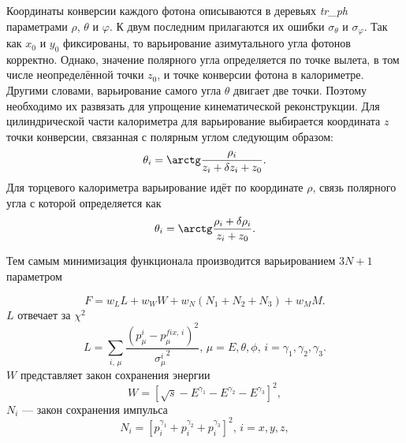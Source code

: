 Координаты конверсии каждого фотона описываются в деревьях \textit{tr\_ph} параметрами $\rho$, $\theta$ и $\varphi$.
К двум последним прилагаются их ошибки $\sigma_\theta$ и $\sigma_\varphi$.
Так как $x_0$ и $y_0$ фиксированы,
то варьирование азимутального угла фотонов корректно.
Однако,
значение полярного угла определяется по точке вылета,
в том числе неопределённой точки $z_0$,
и точке конверсии фотона в калориметре.
Другими словами,
варьирование самого угла $\theta$ двигает две точки.
Поэтому необходимо их развязать для упрощение кинематической реконструкции.
Для цилиндрической части калориметра для варьирование выбирается координата $z$ точки конверсии,
связанная с полярным углом следующим образом:
\begin{equation}
    \theta_i
    =
    \arctg
    \frac{\rho_i}{z_i + \delta z_i + z_0} .
\end{equation}
Для торцевого калориметра варьирование идёт по координате $\rho$,
связь полярного угла с которой определяется как
\begin{equation}
    \theta_i
    =
    \arctg
    \frac{\rho_i + \delta \rho_i}{z_i + z_0} .
\end{equation}

Тем самым минимизация функционала производится варьированием $3 N + 1$ параметром

\begin{equation}
F = w_L L + w_W W + w_N \left( N_1 + N_2 + N_3 \right) + w_M M.
\end{equation}
$L$ отвечает за $\chi^{2}$
\begin{equation}
	L
	= 
	\sum_{i, \, \mu} 
	\frac{ \left( p^{i}_\mu -p^{fix,\,i}_\mu \right)^2 }{{\sigma^i_\mu}^2} , 
	\, \mu = E, \theta, \phi, \, i = \gamma_1, \gamma_2, \gamma_3.
\end{equation}
$W$ представляет закон сохранения энергии
\begin{equation}
	W = \left[ \sqrt{s} - E^{\gamma_1}- E^{\gamma_2}- E^{\gamma_3} \right]^2 ,
\end{equation}
$N_i$ --- закон сохранения импульса
\begin{equation}
	N_i = \left[ p_i^{\gamma_1} + p_i^{\gamma_2} + p_i^{\gamma_3} \right]^2, \, i=x,y,z ,
\end{equation}

